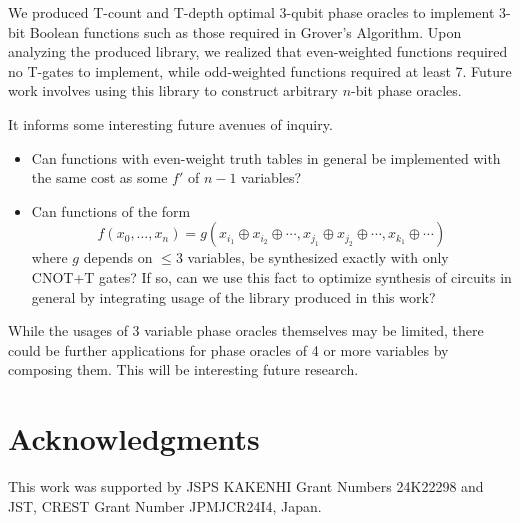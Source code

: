 \documentclass[a4paper]{article}
\begin{document}
We produced T-count and T-depth optimal 3-qubit phase oracles to implement 3-bit Boolean functions
such as those required in Grover's Algorithm. Upon analyzing the produced library, we realized that
even-weighted functions required no T-gates to implement, while odd-weighted functions required at least 7.
Future work involves using this library to construct arbitrary $n$-bit phase oracles.

It informs some interesting future avenues of inquiry.
\begin{itemize}
  \item Can functions with even-weight truth tables in general be implemented with the same cost as some $f'$ of $n-1$ variables?
  \item Can functions of the form
  \[
  f(x_0,\ldots,x_n) = g(x_{i_1} \oplus x_{i_2} \oplus \cdots, x_{j_1} \oplus x_{j_2} \oplus \cdots, x_{k_1} \oplus \cdots)
  \]
  where $g$ depends on $\leq 3$ variables, be synthesized exactly with only CNOT+T gates? If so, can we use this fact to optimize
  synthesis of circuits in general by integrating usage of the library produced in this work?
\end{itemize}

While the usages of 3 variable phase oracles themselves may be limited, there could be further applications for
phase oracles of 4 or more variables by composing them. This will be interesting future research.

\section*{Acknowledgments}                                                     
This work was supported by JSPS KAKENHI Grant Numbers 24K22298 and JST, CREST Grant Number JPMJCR24I4, Japan.




\end{document}
